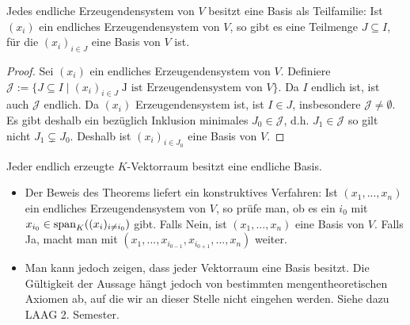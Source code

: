 \begin{theorem}[Basisauswahlsatz]
	Jedes endliche Erzeugendensystem von $V$ besitzt eine Basis  als 
	Teilfamilie: Ist $(x_i)$ ein endliches Erzeugendensystem von $V$, so gibt es eine Teilmenge $J\subseteq I$, 
	für die $(x_i)_{i\in J}$ eine Basis von $V$ ist. 
\end{theorem}
\begin{proof}
	Sei $(x_i)$ ein endliches Erzeugendensystem von $V$. Definiere $\mathcal J:=\{J \subseteq I \mid (x_i)_{i\in J}\; 
	\text{J ist Erzeugendensystem von }V\}$. Da $I$ endlich ist, ist auch $\mathcal J$ endlich. Da $(x_i)$ 
	Erzeugendensystem ist, ist $I\in J$, insbesondere $\mathcal J\neq\emptyset$. Es gibt deshalb ein bezüglich 
	Inklusion minimales $J_0\in \mathcal J$, d.h. $J_1 \in \mathcal J$ so gilt nicht $J_1 \subsetneq J_0$. Deshalb 
	ist $(x_i)_{i\in J_0}$ eine Basis von $V$.
\end{proof}

\begin{conclusion}
	Jeder endlich erzeugte $K$-Vektorraum besitzt eine endliche Basis.
\end{conclusion}

\begin{remark}
	\begin{itemize}
		\item Der Beweis des Theorems liefert ein konstruktives Verfahren: Ist $(x_1,...,x_n)$ ein endliches 
		Erzeugendensystem von $V$, so prüfe man, ob es ein $i_0$ mit $x_{i_0} \in \operatorname{span}_K((x_i)_{i\neq i_0})$ gibt. 
		Falls Nein, ist $(x_1,...,x_n)$ eine Basis von $V$. Falls Ja, macht man mit $(x_1,...,x_{i_{0-1}}, x_{i_{0+1}},
		...,x_n)$ weiter.
		\item Man kann jedoch zeigen, dass jeder Vektorraum eine Basis besitzt. Die Gültigkeit der Aussage hängt jedoch 
		von bestimmten mengentheoretischen Axiomen ab, auf die wir an dieser Stelle nicht eingehen werden. Siehe dazu 
		LAAG 2. Semester.
	\end{itemize}
\end{remark}

